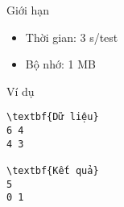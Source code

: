 Giới hạn  
\begin{itemize}   Kích thước: 0 $<$ a, b ≤ 500   
	\item     Thời gian: 3 s/test   
	\item     Bộ nhớ: 1 MB   
\end{itemize}
   Ví dụ  
\begin{verbatim}
\textbf{Dữ liệu}
6 4
4 3	

\textbf{Kết quả}
5
0 1
\end{verbatim}